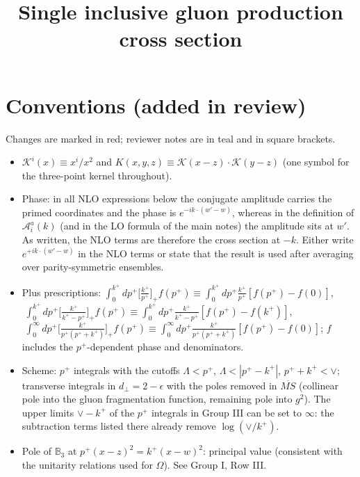 \documentclass[9pt]{article}
\title{Single inclusive gluon production cross section}
\author{}
\date{}
\def\mf#1{\mathbb{#1}}
\newcommand{\chg}[1]{{\color{red}#1}}
\numberwithin{equation}{section}
\begin{document}
\maketitle
\section*{\chg{Conventions (added in review)}}
\chg{Changes are marked in red; reviewer notes are in teal and in square brackets.}
\begin{itemize}
\item \chg{$\mathcal{K}^{i}(x)\equiv x^{i}/x^{2}$ and $K(x,y,z)\equiv\mathcal{K}(x-z)\cdot\mathcal{K}(y-z)$ (one symbol for the three-point kernel throughout).}
\item \chg{Phase: in all NLO expressions below the conjugate amplitude carries the primed coordinates and the phase is $e^{-ik\cdot(w'-w)}$, whereas in the definition of $\mathcal{A}^{a}_{i}(k)$ (and in the LO formula of the main notes) the amplitude sits at $w'$. As written, the NLO terms are therefore the cross section at $-k$. Either write $e^{+ik\cdot(w'-w)}$ in the NLO terms or state that the result is used after averaging over parity-symmetric ensembles.}
\item \chg{Plus prescriptions: $\int_{0}^{k^{+}}dp^{+}\big[\frac{k^{+}}{p^{+}}\big]_{+}f(p^{+})\equiv\int_{0}^{k^{+}}dp^{+}\frac{k^{+}}{p^{+}}[f(p^{+})-f(0)]$, $\;\int_{0}^{k^{+}}dp^{+}\big[\frac{k^{+}}{k^{+}-p^{+}}\big]_{+}f(p^{+})\equiv\int_{0}^{k^{+}}dp^{+}\frac{k^{+}}{k^{+}-p^{+}}[f(p^{+})-f(k^{+})]$, $\;\int_{0}^{\infty}dp^{+}\big[\frac{k^{+}}{p^{+}(p^{+}+k^{+})}\big]_{+}f(p^{+})\equiv\int_{0}^{\infty}dp^{+}\frac{k^{+}}{p^{+}(p^{+}+k^{+})}[f(p^{+})-f(0)]$; $f$ includes the $p^{+}$-dependent phase and denominators.}
\item \chg{Scheme: $p^{+}$ integrals with the cutoffs $\Lambda<p^{+}$, $\Lambda<|p^{+}-k^{+}|$, $p^{+}+k^{+}<\vee$; transverse integrals in $d_{\perp}=2-\epsilon$ with the poles removed in $\overline{MS}$ (collinear pole into the gluon fragmentation function, remaining pole into $g^{2}$). The upper limits $\vee-k^{+}$ of the $p^{+}$ integrals in Group III can be set to $\infty$: the subtraction terms listed there already remove $\log(\vee/k^{+})$.}
\item \chg{Pole of $\mf{B}_{3}$ at $p^{+}(x-z)^{2}=k^{+}(x-w)^{2}$: principal value (consistent with the unitarity relations used for $\Omega$). See Group I, Row III.}
\end{itemize}
\end{document}
